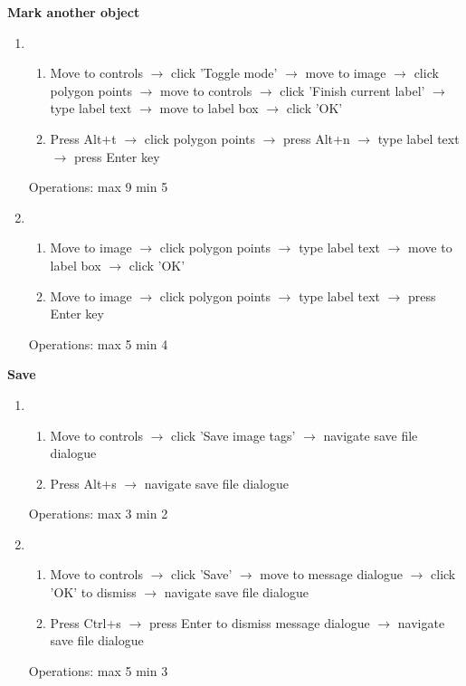 \documentclass[a4paper,11pt,oneside]{article}
\begin{document}
{\bf Mark another object}
\begin{enumerate}
    \item
    \begin{enumerate}
        \item Move to controls $\rightarrow$ click 'Toggle mode' $\rightarrow$ move to image $\rightarrow$ click polygon points $\rightarrow$ move to controls $\rightarrow$ click 'Finish current label' $\rightarrow$ type label text $\rightarrow$ move to label box $\rightarrow$ click 'OK'
        \item Press Alt+t $\rightarrow$ click polygon points $\rightarrow$ press Alt+n $\rightarrow$ type label text $\rightarrow$ press Enter key
    \end{enumerate}
    Operations: max 9 min 5
    \item
    \begin{enumerate}
        \item Move to image $\rightarrow$ click polygon points $\rightarrow$ type label text $\rightarrow$ move to label box $\rightarrow$ click 'OK'
        \item Move to image $\rightarrow$ click polygon points $\rightarrow$ type label text $\rightarrow$ press Enter key
    \end{enumerate}
    Operations: max 5 min 4
\end{enumerate}

{\bf Save}
\begin{enumerate}
    \item
    \begin{enumerate}
        \item Move to controls $\rightarrow$ click 'Save image tags' $\rightarrow$ navigate save file dialogue
        \item Press Alt+s $\rightarrow$ navigate save file dialogue
    \end{enumerate}
    Operations: max 3 min 2
    \item
    \begin{enumerate}
        \item Move to controls $\rightarrow$ click 'Save' $\rightarrow$ move to message dialogue $\rightarrow$ click 'OK' to dismiss $\rightarrow$ navigate save file dialogue
        \item Press Ctrl+s $\rightarrow$ press Enter to dismiss message dialogue $\rightarrow$ navigate save file dialogue
    \end{enumerate}
    Operations: max 5 min 3
\end{enumerate}
\end{document}

